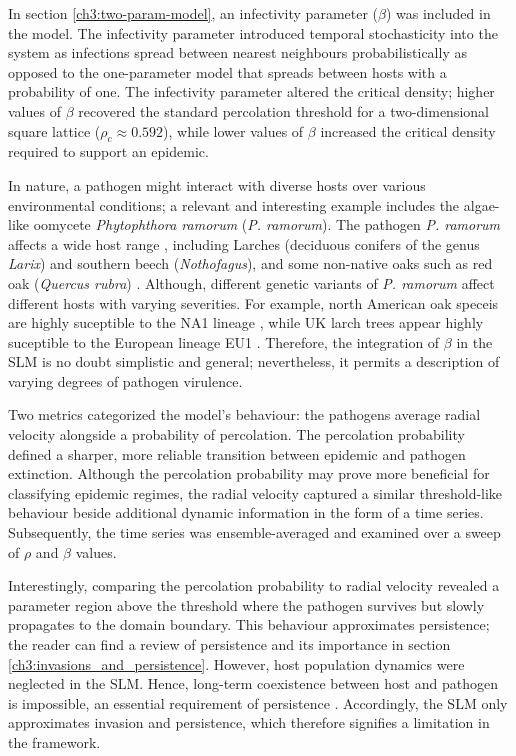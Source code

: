 In section \ref{ch3:two-param-model}, an infectivity parameter ($\beta$) was included in the model.
The infectivity parameter introduced temporal stochasticity into the system as infections spread between nearest neighbours probabilistically\textemdash
as opposed to the one-parameter model that spreads between hosts with a probability of one.
The infectivity parameter altered the critical density; 
higher values of $\beta$ recovered the standard percolation threshold for a two-dimensional square lattice ($\rho_c\approx 0.592$), 
while lower values of $\beta$ increased the critical density required to support an epidemic.

In nature, a pathogen might interact with diverse hosts over various environmental conditions;
a relevant and interesting example includes the algae-like oomycete \textit{Phytophthora ramorum} (\textit{P. ramorum}). 
The pathogen \textit{P. ramorum} affects a wide host range \cite{GRUNWALD2012131}, 
including Larches (deciduous conifers of the genus \textit{Larix}) and southern beech (\textit{Nothofagus}), 
and some non-native oaks such as red oak (\textit{Quercus rubra}) \cite{grunwald2008phytophthora}.
Although, different genetic variants of \textit{P. ramorum} affect different hosts with varying severities.
For example, north American oak speceis are highly suceptible to the NA1 lineage \cite{rizzo2002phytophthora}, 
while UK larch trees appear highly suceptible to the European lineage EU1 \cite{king2015planta}. 
Therefore, the integration of $\beta$ in the SLM is no doubt simplistic and general; nevertheless, it permits a description of varying degrees of pathogen virulence.

Two metrics categorized the model's behaviour: the pathogens average radial velocity alongside a probability of percolation.
The percolation probability defined a sharper, more reliable transition between epidemic and pathogen extinction.
Although the percolation probability may prove more beneficial for classifying epidemic regimes, the radial velocity captured a similar threshold-like behaviour beside additional dynamic information in the form of a time series.
Subsequently, the time series was ensemble-averaged and examined over a sweep of $\rho$ and $\beta$ values. 

Interestingly, comparing the percolation probability to radial velocity revealed a parameter region above the threshold where the pathogen survives but slowly propagates to the domain boundary. 
This behaviour approximates persistence; the reader can find a  review of persistence and its importance in section \ref{ch3:invasions_and_persistence}.
However, host population dynamics were neglected in the SLM. 
Hence, long-term coexistence between host and pathogen is impossible, an essential requirement of persistence \cite{gilligan2008epidemiological}. 
Accordingly, the SLM only approximates invasion and persistence, which therefore signifies a limitation in the framework. 

